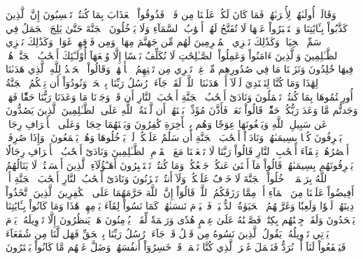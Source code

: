 وَقَالَتۡ أُولَىٰهُمۡ لِأُخۡرَىٰهُمۡ فَمَا كَانَ لَكُمۡ عَلَيۡنَا مِن فَضۡلٖ فَذُوقُواْ ٱلۡعَذَابَ بِمَا كُنتُمۡ تَكۡسِبُونَ
إِنَّ ٱلَّذِينَ كَذَّبُواْ بِـَٔايَٰتِنَا وَٱسۡتَكۡبَرُواْ عَنۡهَا لَا تُفَتَّحُ لَهُمۡ أَبۡوَٰبُ ٱلسَّمَآءِ وَلَا يَدۡخُلُونَ ٱلۡجَنَّةَ حَتَّىٰ يَلِجَ ٱلۡجَمَلُ فِي سَمِّ ٱلۡخِيَاطِۚ وَكَذَٰلِكَ نَجۡزِي ٱلۡمُجۡرِمِينَ
لَهُم مِّن جَهَنَّمَ مِهَادٞ وَمِن فَوۡقِهِمۡ غَوَاشٖۚ وَكَذَٰلِكَ نَجۡزِي ٱلظَّـٰلِمِينَ
وَٱلَّذِينَ ءَامَنُواْ وَعَمِلُواْ ٱلصَّـٰلِحَٰتِ لَا نُكَلِّفُ نَفۡسًا إِلَّا وُسۡعَهَآ أُوْلَـٰٓئِكَ أَصۡحَٰبُ ٱلۡجَنَّةِۖ هُمۡ فِيهَا خَٰلِدُونَ
وَنَزَعۡنَا مَا فِي صُدُورِهِم مِّنۡ غِلّٖ تَجۡرِي مِن تَحۡتِهِمُ ٱلۡأَنۡهَٰرُۖ وَقَالُواْ ٱلۡحَمۡدُ لِلَّهِ ٱلَّذِي هَدَىٰنَا لِهَٰذَا وَمَا كُنَّا لِنَهۡتَدِيَ لَوۡلَآ أَنۡ هَدَىٰنَا ٱللَّهُۖ لَقَدۡ جَآءَتۡ رُسُلُ رَبِّنَا بِٱلۡحَقِّۖ وَنُودُوٓاْ أَن تِلۡكُمُ ٱلۡجَنَّةُ أُورِثۡتُمُوهَا بِمَا كُنتُمۡ تَعۡمَلُونَ
وَنَادَىٰٓ أَصۡحَٰبُ ٱلۡجَنَّةِ أَصۡحَٰبَ ٱلنَّارِ أَن قَدۡ وَجَدۡنَا مَا وَعَدَنَا رَبُّنَا حَقّٗا فَهَلۡ وَجَدتُّم مَّا وَعَدَ رَبُّكُمۡ حَقّٗاۖ قَالُواْ نَعَمۡۚ فَأَذَّنَ مُؤَذِّنُۢ بَيۡنَهُمۡ أَن لَّعۡنَةُ ٱللَّهِ عَلَى ٱلظَّـٰلِمِينَ
ٱلَّذِينَ يَصُدُّونَ عَن سَبِيلِ ٱللَّهِ وَيَبۡغُونَهَا عِوَجٗا وَهُم بِٱلۡأٓخِرَةِ كَٰفِرُونَ
وَبَيۡنَهُمَا حِجَابٞۚ وَعَلَى ٱلۡأَعۡرَافِ رِجَالٞ يَعۡرِفُونَ كُلَّۢا بِسِيمَىٰهُمۡۚ وَنَادَوۡاْ أَصۡحَٰبَ ٱلۡجَنَّةِ أَن سَلَٰمٌ عَلَيۡكُمۡۚ لَمۡ يَدۡخُلُوهَا وَهُمۡ يَطۡمَعُونَ
۞وَإِذَا صُرِفَتۡ أَبۡصَٰرُهُمۡ تِلۡقَآءَ أَصۡحَٰبِ ٱلنَّارِ قَالُواْ رَبَّنَا لَا تَجۡعَلۡنَا مَعَ ٱلۡقَوۡمِ ٱلظَّـٰلِمِينَ
وَنَادَىٰٓ أَصۡحَٰبُ ٱلۡأَعۡرَافِ رِجَالٗا يَعۡرِفُونَهُم بِسِيمَىٰهُمۡ قَالُواْ مَآ أَغۡنَىٰ عَنكُمۡ جَمۡعُكُمۡ وَمَا كُنتُمۡ تَسۡتَكۡبِرُونَ
أَهَـٰٓؤُلَآءِ ٱلَّذِينَ أَقۡسَمۡتُمۡ لَا يَنَالُهُمُ ٱللَّهُ بِرَحۡمَةٍۚ ٱدۡخُلُواْ ٱلۡجَنَّةَ لَا خَوۡفٌ عَلَيۡكُمۡ وَلَآ أَنتُمۡ تَحۡزَنُونَ
وَنَادَىٰٓ أَصۡحَٰبُ ٱلنَّارِ أَصۡحَٰبَ ٱلۡجَنَّةِ أَنۡ أَفِيضُواْ عَلَيۡنَا مِنَ ٱلۡمَآءِ أَوۡ مِمَّا رَزَقَكُمُ ٱللَّهُۚ قَالُوٓاْ إِنَّ ٱللَّهَ حَرَّمَهُمَا عَلَى ٱلۡكَٰفِرِينَ
ٱلَّذِينَ ٱتَّخَذُواْ دِينَهُمۡ لَهۡوٗا وَلَعِبٗا وَغَرَّتۡهُمُ ٱلۡحَيَوٰةُ ٱلدُّنۡيَاۚ فَٱلۡيَوۡمَ نَنسَىٰهُمۡ كَمَا نَسُواْ لِقَآءَ يَوۡمِهِمۡ هَٰذَا وَمَا كَانُواْ بِـَٔايَٰتِنَا يَجۡحَدُونَ
وَلَقَدۡ جِئۡنَٰهُم بِكِتَٰبٖ فَصَّلۡنَٰهُ عَلَىٰ عِلۡمٍ هُدٗى وَرَحۡمَةٗ لِّقَوۡمٖ يُؤۡمِنُونَ
هَلۡ يَنظُرُونَ إِلَّا تَأۡوِيلَهُۥۚ يَوۡمَ يَأۡتِي تَأۡوِيلُهُۥ يَقُولُ ٱلَّذِينَ نَسُوهُ مِن قَبۡلُ قَدۡ جَآءَتۡ رُسُلُ رَبِّنَا بِٱلۡحَقِّ فَهَل لَّنَا مِن شُفَعَآءَ فَيَشۡفَعُواْ لَنَآ أَوۡ نُرَدُّ فَنَعۡمَلَ غَيۡرَ ٱلَّذِي كُنَّا نَعۡمَلُۚ قَدۡ خَسِرُوٓاْ أَنفُسَهُمۡ وَضَلَّ عَنۡهُم مَّا كَانُواْ يَفۡتَرُونَ

